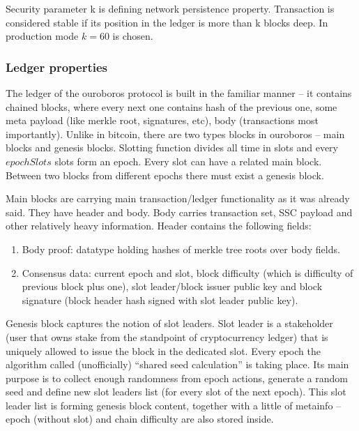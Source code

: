\documentclass[]{itmo-student-thesis}
\begin{document}
Security parameter k is defining network persistence
property. Transaction is considered stable if its position in the
ledger is more than k blocks deep. In production mode $k=60$ is
chosen.

\subsubsection{Ledger properties}

The ledger of the ouroboros protocol is built in the familiar manner
-- it contains chained blocks, where every next one contains hash of
the previous one, some meta payload (like merkle root, signatures,
etc), body (transactions most importantly). Unlike in bitcoin, there
are two types blocks in ouroboros -- main blocks and genesis
blocks. Slotting function divides all time in slots and every
$epochSlots$ slots form an epoch. Every slot can have a related main
block. Between two blocks from different epochs there must exist a
genesis block.

Main blocks are carrying main transaction/ledger functionality as it
was already said. They have header and body. Body carries transaction
set, SSC payload and other relatively heavy information. Header
contains the following fields:

\begin{enumerate}
\item Body proof: datatype holding hashes of merkle tree roots over body
fields.

\item Consensus data: current epoch and slot, block difficulty (which is
difficulty of previous block plus one), slot leader/block issuer
public key and block signature (block header hash signed with slot
leader public key).

\end{enumerate}

Genesis block captures the notion of slot leaders. Slot leader is a
stakeholder (user that owns stake from the standpoint of
cryptocurrency ledger) that is uniquely allowed to issue the block in
the dedicated slot. Every epoch the algorithm called (unofficially)
“shared seed calculation” is taking place. Its main purpose is to
collect enough randomness from epoch actions, generate a random seed
and define new slot leaders list (for every slot of the next
epoch). This slot leader list is forming genesis block content,
together with a little of metainfo -- epoch (without slot) and chain
difficulty are also stored inside.
\end{document}
